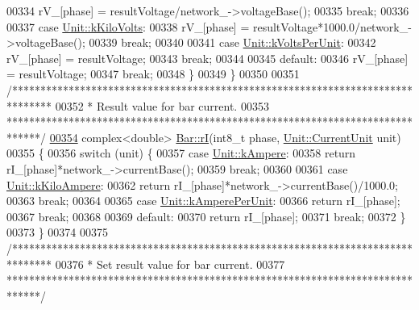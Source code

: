 \begin{DoxyCode}
00334     rV\_[phase] = resultVoltage/network\_->voltageBase();
00335     \textcolor{keywordflow}{break};
00336 
00337   \textcolor{keywordflow}{case} \hyperlink{class_unit_a55b07dfa9457e1eca2c7194fe0cfc3c1a35a201a658c2cd89766787c657e9a54d}{Unit::kKiloVolts}:
00338     rV\_[phase] = resultVoltage*1000.0/network\_->voltageBase();
00339     \textcolor{keywordflow}{break};
00340 
00341   \textcolor{keywordflow}{case} \hyperlink{class_unit_a55b07dfa9457e1eca2c7194fe0cfc3c1ab44b1310b59fdcdc9df5bbea91da4206}{Unit::kVoltsPerUnit}:
00342     rV\_[phase] = resultVoltage;
00343     \textcolor{keywordflow}{break};
00344 
00345   \textcolor{keywordflow}{default}:
00346     rV\_[phase] = resultVoltage;
00347     \textcolor{keywordflow}{break};
00348   \}
00349 \}
00350 
00351 \textcolor{comment}{/*******************************************************************************}
00352 \textcolor{comment}{ * Result value for bar current.}
00353 \textcolor{comment}{ ******************************************************************************/}
\hypertarget{bar_8cpp_source_l00354}{}\hyperlink{group___models_ga50eb46f3510205a9d6cb5e6547fa86df}{00354} complex<double> \hyperlink{group___models_ga50eb46f3510205a9d6cb5e6547fa86df}{Bar::rI}(int8\_t phase, \hyperlink{class_unit_a0794cf6c9682f48296dd4a5315389787}{Unit::CurrentUnit} unit)
00355 \{
00356   \textcolor{keywordflow}{switch} (unit) \{
00357   \textcolor{keywordflow}{case} \hyperlink{class_unit_a0794cf6c9682f48296dd4a5315389787a368a3c470f0b590a6100dda717a7dd4f}{Unit::kAmpere}:
00358     \textcolor{keywordflow}{return} rI\_[phase]*network\_->currentBase();
00359     \textcolor{keywordflow}{break};
00360 
00361   \textcolor{keywordflow}{case} \hyperlink{class_unit_a0794cf6c9682f48296dd4a5315389787aa27cb5edd73099f24f2285e02396ae14}{Unit::kKiloAmpere}:
00362     \textcolor{keywordflow}{return} rI\_[phase]*network\_->currentBase()/1000.0;
00363     \textcolor{keywordflow}{break};
00364 
00365   \textcolor{keywordflow}{case} \hyperlink{class_unit_a0794cf6c9682f48296dd4a5315389787aeed3b50e464d581cb630181a3b6a0709}{Unit::kAmperePerUnit}:
00366     \textcolor{keywordflow}{return} rI\_[phase];
00367     \textcolor{keywordflow}{break};
00368 
00369   \textcolor{keywordflow}{default}:
00370     \textcolor{keywordflow}{return} rI\_[phase];
00371     \textcolor{keywordflow}{break};
00372   \}
00373 \}
00374 
00375 \textcolor{comment}{/*******************************************************************************}
00376 \textcolor{comment}{ * Set result value for bar current.}
00377 \textcolor{comment}{ ******************************************************************************/}

\end{DoxyCode}
